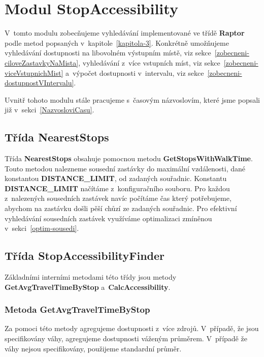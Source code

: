 \section{Modul StopAccessibility}\label{modul-StopAccessibility}

V~tomto modulu zobecňujeme vyhledávání implementované ve třídě \textbf{Raptor} podle metod popsaných v~kapitole~\ref{kapitola-3}. Konkrétně umožňujeme vyhledávání dostupnosti na libovolném výstupním místě, viz sekce~\ref{zobecneni-ciloveZastavkyNaMista}, vyhledávání z~více vstupních míst, viz sekce~\ref{zobecneni-viceVstupnichMist} a~výpočet dostupnosti v~intervalu, viz sekce~\ref{zobecneni-dostupnostVIntervalu}.

Uvnitř tohoto modulu stále pracujeme s~časovým názvoslovím, které jsme popsali již v~sekci~\ref{NazvosloviCasu}.


\subsection{Třída NearestStops}\label{class-NearestStops}

Třída \textbf{NearestStops} obsahuje pomocnou metodu \textbf{GetStopsWithWalkTime}. Touto metodou nalezneme sousední zastávky do maximální vzdálenosti, dané konstantou \textbf{DISTANCE\_LIMIT}, od zadaných souřadnic. Konstantu \textbf{DISTANCE\_LIMIT} načítáme z~konfiguračního souboru. Pro každou z~nalezených sousedních zastávek navíc počítáme čas který potřebujeme, abychom na zastávku došli pěší chůzí ze zadaných souřadnic. Pro efektivní vyhledávání sousedních zastávek využíváme optimalizaci zmíněnou v~sekci~\ref{optim-sousedi}.

\subsection{Třída StopAccessibilityFinder}

Základními interními metodami této třídy jsou metody \textbf{GetAvgTravelTimeByStop} a~\textbf{CalcAccessibility}.

\subsubsection{Metoda GetAvgTravelTimeByStop}

Za pomoci této metody agregujeme dostupnosti z~více zdrojů. V~případě, že jsou specifikovány váhy, agregujeme dostupnosti váženým průměrem. V~případě že váhy nejsou specifikovány, použijeme standardní průměr.

